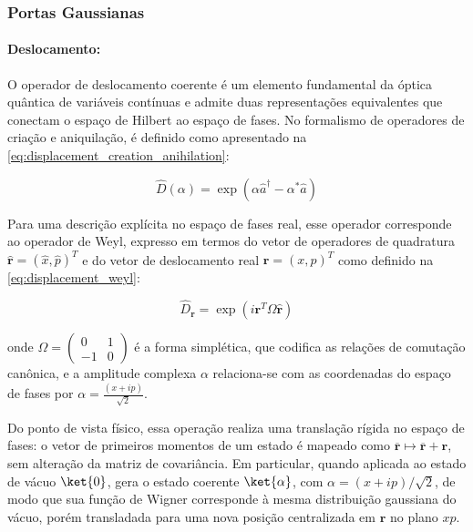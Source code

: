 \subsubsection{Portas Gaussianas}

\paragraph*{\textbf{Deslocamento}:}

O operador de deslocamento coerente é um elemento fundamental da óptica quântica de variáveis contínuas e admite duas representações equivalentes que conectam o espaço de Hilbert ao espaço de fases. No formalismo de operadores de criação e aniquilação, é definido como apresentado na \autoref{eq:displacement_creation_anihilation}:

\begin{equation}
\label{eq:displacement_creation_anihilation}
\hat{D}(\alpha) = \exp(\alpha\hat{a}^\dagger - \alpha^*\hat{a})
\end{equation}

Para uma descrição explícita no espaço de fases real, esse operador corresponde ao operador de Weyl, expresso em termos do vetor de operadores de quadratura $\hat{\mathbf{r}}=(\hat{x},\hat{p})^T$ e do vetor de deslocamento real $\mathbf{r}=(x,p)^T$ como definido na \autoref{eq:displacement_weyl}:

\begin{equation}
\label{eq:displacement_weyl}
\hat{D}_{\mathbf{r}} = \exp(i\mathbf{r}^T \Omega \hat{\mathbf{r}})
\end{equation}

\noindent onde $\Omega = \displaystyle\left(\begin{array}{cc} 0 & 1 \\ -1 & 0 \end{array}\right)$ é a forma simplética, que codifica as relações de comutação canônica, e a amplitude complexa $\alpha$ relaciona-se com as coordenadas do espaço de fases por $\alpha =\displaystyle\frac{(x+ip)}{\sqrt{2}}$.

Do ponto de vista físico, essa operação realiza uma translação rígida no espaço de fases: o vetor de primeiros momentos de um estado é mapeado como $\overline{\mathbf{r}} \mapsto \overline{\mathbf{r}} + \mathbf{r}$, sem alteração da matriz de covariância. Em particular, quando aplicada ao estado de vácuo $\ket{0}$, gera o estado coerente $\ket{\alpha}$, com $\alpha=(x+ip)/\sqrt{2}$, de modo que sua função de Wigner corresponde à mesma distribuição gaussiana do vácuo, porém transladada para uma nova posição centralizada em $\mathbf{r}$ no plano $xp$.

